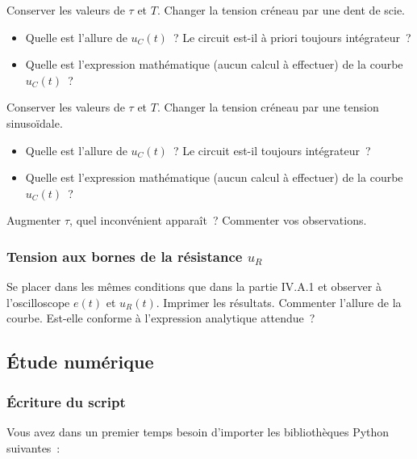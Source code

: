 \documentclass[../main/main.tex]{subfiles}
\begin{document}
\medskip

Conserver les valeurs de $\tau$ et $T$. Changer la tension créneau par une dent
de scie.

\medskip

\begin{itemize}
	\item Quelle est l'allure de $u_{C}(t)$~? Le circuit est-il à priori
	      toujours intégrateur~?
	\item Quelle est l'expression mathématique (aucun calcul à effectuer) de la
	      courbe $u_{C}(t)$~?
\end{itemize}

\medskip

Conserver les valeurs de $\tau$ et $T$. Changer la tension créneau par une
tension sinusoïdale.

\medskip

\begin{itemize}
	\item Quelle est l'allure de $u_{C}(t)$~? Le circuit est-il toujours
	      intégrateur~?
	\item Quelle est l'expression mathématique (aucun calcul à effectuer) de la
	      courbe $u_{C}(t)$~?
\end{itemize}

\medskip

Augmenter $\tau$, quel inconvénient apparaît~? Commenter vos observations.

\subsubsection{Tension aux bornes de la résistance $u_R$}

Se placer dans les mêmes conditions que dans la partie IV.A.1 et observer à
l'oscilloscope $e(t)$ et $u_{R}(t)$. Imprimer les résultats. Commenter l'allure
de la courbe. Est-elle conforme à l'expression analytique attendue~?

\subsection{Étude numérique}

\subsubsection{Écriture du script}

Vous avez dans un premier temps besoin d'importer les bibliothèques Python
suivantes~:
\end{document}
